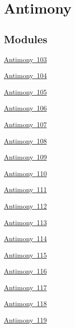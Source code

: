 \hypertarget{group___isotope_const-_antimony}{}\section{Antimony}
\label{group___isotope_const-_antimony}
\subsection*{Modules}
\begin{DoxyCompactItemize}
\item 
\mbox{\hyperlink{group___isotope_const-_antimony-_sb103}{Antimony 103}}
\item 
\mbox{\hyperlink{group___isotope_const-_antimony-_sb104}{Antimony 104}}
\item 
\mbox{\hyperlink{group___isotope_const-_antimony-_sb105}{Antimony 105}}
\item 
\mbox{\hyperlink{group___isotope_const-_antimony-_sb106}{Antimony 106}}
\item 
\mbox{\hyperlink{group___isotope_const-_antimony-_sb107}{Antimony 107}}
\item 
\mbox{\hyperlink{group___isotope_const-_antimony-_sb108}{Antimony 108}}
\item 
\mbox{\hyperlink{group___isotope_const-_antimony-_sb109}{Antimony 109}}
\item 
\mbox{\hyperlink{group___isotope_const-_antimony-_sb110}{Antimony 110}}
\item 
\mbox{\hyperlink{group___isotope_const-_antimony-_sb111}{Antimony 111}}
\item 
\mbox{\hyperlink{group___isotope_const-_antimony-_sb112}{Antimony 112}}
\item 
\mbox{\hyperlink{group___isotope_const-_antimony-_sb113}{Antimony 113}}
\item 
\mbox{\hyperlink{group___isotope_const-_antimony-_sb114}{Antimony 114}}
\item 
\mbox{\hyperlink{group___isotope_const-_antimony-_sb115}{Antimony 115}}
\item 
\mbox{\hyperlink{group___isotope_const-_antimony-_sb116}{Antimony 116}}
\item 
\mbox{\hyperlink{group___isotope_const-_antimony-_sb117}{Antimony 117}}
\item 
\mbox{\hyperlink{group___isotope_const-_antimony-_sb118}{Antimony 118}}
\item 
\mbox{\hyperlink{group___isotope_const-_antimony-_sb119}{Antimony 119}}
\item 

\end{DoxyCompactItemize}
